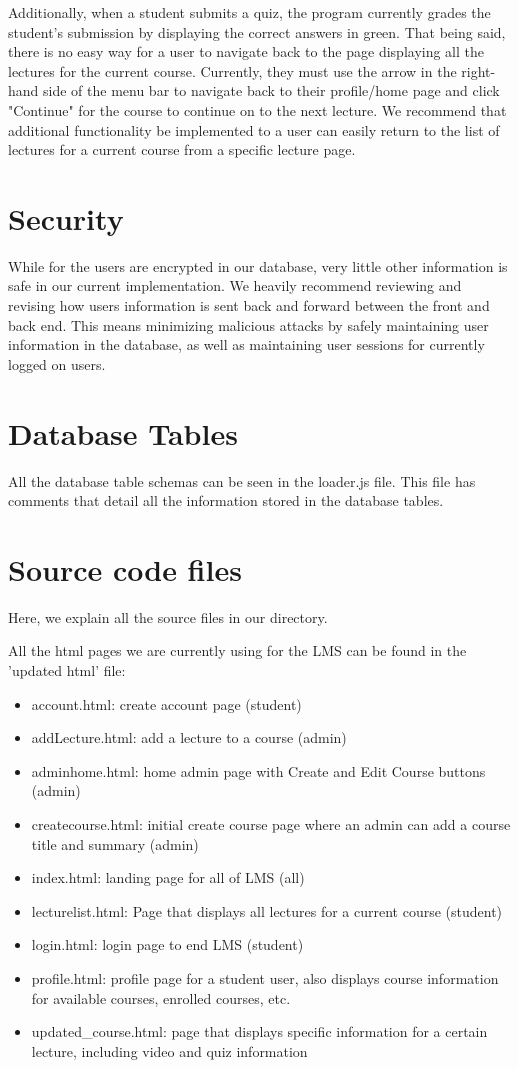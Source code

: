 \documentclass[12pt]{article}
\begin{document}
Additionally, when a student submits a quiz, the program currently grades the student's submission by displaying the correct answers in green. That being said, there is no easy way for a user to navigate back to the page displaying all the lectures for the current course. Currently, they must use the arrow in the right-hand side of the menu bar to navigate back to their profile/home page and click "Continue" for the course to continue on to the next lecture. We recommend that additional functionality be implemented to a user can easily return to the list of lectures for a current course from a specific lecture page.
\section{Security}
While for the users are encrypted in our database, very little other information is safe in our current implementation. We heavily recommend reviewing and revising how users information is sent back and forward between the front and back end. This means minimizing malicious attacks by safely maintaining user information in the database, as well as maintaining user sessions for currently logged on users.

\section{Database Tables}
All the database table schemas can be seen in the loader.js file. This file has comments that detail all the information stored in the database tables.

\section{Source code files}
Here, we explain all the source files in our directory.

All the html pages we are currently using for the LMS can be found in the 'updated html' file:
\begin{itemize}
\item account.html: create account page (student)
\item addLecture.html: add a lecture to a course (admin)
\item adminhome.html: home admin page with Create and Edit Course buttons (admin)
\item createcourse.html: initial create course page where an admin can add a course title and summary (admin)
\item index.html: landing page for all of LMS (all)
\item lecturelist.html: Page that displays all lectures for a current course (student)
\item login.html: login page to end LMS (student)
\item profile.html: profile page for a student user, also displays course information for available courses, enrolled courses, etc.
\item updated\_course.html: page that displays specific information for a certain lecture, including video and quiz information
\end{itemize}
\end{document}
